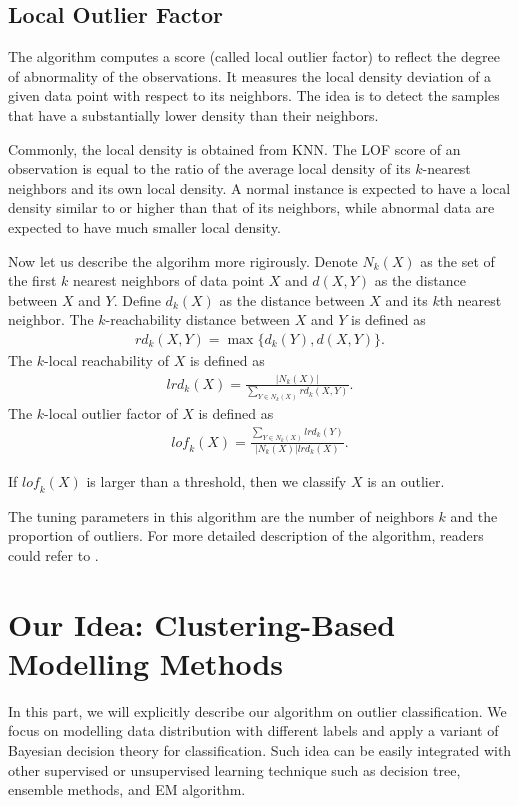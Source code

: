 \documentclass[english]{article}
\newenvironment{eqt}{\begin{equation}\begin{aligned}}{\end{aligned}\end{equation}}
\begin{document}
\subsection{Local Outlier Factor}
\par
The algorithm computes a score (called local outlier factor) to reflect the degree of abnormality of the observations. It measures the local density deviation of a given data point with respect to its neighbors. The idea is to detect the samples that have a substantially lower density than their neighbors.
\par
Commonly, the local density is obtained from KNN. The LOF score of an observation is equal to the ratio of the average local density of its $k$-nearest neighbors and its own local density. A normal instance is expected to have a local density similar to or higher than that of its neighbors, while abnormal data are expected to have much smaller local density.
\par
Now let us describe the algorihm more rigirously. Denote $N_k(X)$ as the set of the first $k$ nearest neighbors of data point $X$ and $d(X, Y)$ as the distance between $X$ and $Y$. Define $d_k(X)$ as the distance between $X$ and its $k$th nearest neighbor. The $k$-reachability distance between $X$ and $Y$ is defined as
\begin{eqt}
\textit{rd}_k(X, Y) = \max\{d_k(Y), d(X, Y)\}.
\end{eqt}
The $k$-local reachability of $X$ is defined as 
\begin{eqt}
\textit{lrd}_k(X) = \frac{|N_k(X)|}{\sum_{Y\in N_k(X)}\textit{rd}_k(X, Y)}.
\end{eqt}
The $k$-local outlier factor of $X$ is defined as 
\begin{eqt}
\textit{lof}_k(X) = \frac{\sum_{Y\in N_k(X)}\textit{lrd}_k(Y)}{|N_k(X)|\textit{lrd}_k(X)}.
\end{eqt}

\par If $\textit{lof}_k(X)$ is larger than a threshold, then we classify $X$ is an outlier. 
\par The tuning parameters in this algorithm are the number of neighbors $k$ and the proportion of outliers. For more detailed description of the algorithm, readers could refer to \cite{lof}.

\section{Our Idea: Clustering-Based Modelling Methods}
\par
In this part, we will explicitly describe our algorithm on outlier classification. We focus on modelling data distribution with different labels and apply a variant of Bayesian decision theory for classification. Such idea can be easily integrated with other supervised or unsupervised learning technique such as decision tree, ensemble methods, and EM algorithm.
\end{document}
